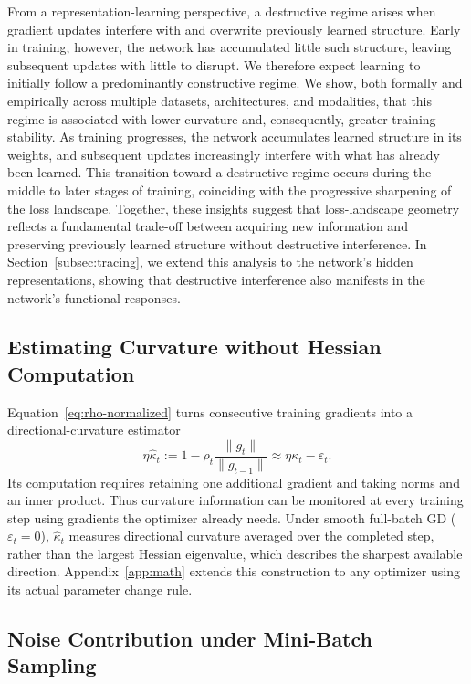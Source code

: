 From a representation-learning perspective, a destructive regime arises when gradient updates interfere with and overwrite previously learned structure. Early in training, however, the network has accumulated little such structure, leaving subsequent updates with little to disrupt. We therefore expect learning to initially follow a predominantly constructive regime. We show, both formally and empirically across multiple datasets, architectures, and modalities, that this regime is associated with lower curvature and, consequently, greater training stability. As training progresses, the network accumulates learned structure in its weights, and subsequent updates increasingly interfere with what has already been learned. This transition toward a destructive regime occurs during the middle to later stages of training, coinciding with the progressive sharpening of the loss landscape. Together, these insights suggest that loss-landscape geometry reflects a fundamental trade-off between acquiring new information and preserving previously learned structure without destructive interference. In Section~\ref{subsec:tracing}, we extend this analysis to the network's hidden representations, showing that destructive interference also manifests in the network's functional responses.

\subsection{Estimating Curvature without Hessian Computation}
\label{subsec:curvature-diagnostic}

Equation~\eqref{eq:rho-normalized} turns consecutive training gradients into a directional-curvature estimator
\begin{equation}
  \eta\widehat\kappa_t
  :=1-\rho_t\frac{\|g_t\|}{\|g_{t-1}\|}
   \approx\eta\kappa_t-\varepsilon_t.
\label{eq:kappa-estimate}
\end{equation}
Its computation requires retaining one additional gradient and taking norms and an inner product. Thus curvature information can be monitored at every training step using gradients the optimizer already needs. Under smooth full-batch GD ($\varepsilon_t=0$), $\widehat\kappa_t$ measures directional curvature averaged over the completed step, rather than the largest Hessian eigenvalue, which describes the sharpest available direction. Appendix~\ref{app:math} extends this construction to any optimizer using its actual parameter change rule.

\subsection{Noise Contribution under Mini-Batch Sampling}
\label{subsec:sampling-noise}

